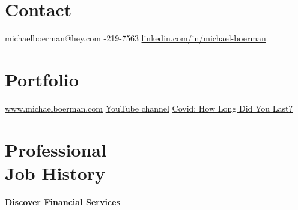 \documentclass[margin, line]{res}
\begin{document}
\address{Data scientist with M.S. and 3 years experience driving decisions by modeling financial and economic data.}
\begin{resume}

\vspace{-1mm}
\section{\sc Contact}

\faEnvelope  \hspace{0.5mm} {\ttfamily michaelboerman@hey.com} \hspace{3mm}
\faPhone  \hspace{0.5mm} {-219-7563} \hspace{8.5mm}
\faLinkedinIn  \hspace{0.5mm} \href{https://www.linkedin.com/in/michael-boerman}{\ttfamily linkedin.com/in/michael-boerman}\\
\vspace{-5mm}


\section{\sc Portfolio}
\faBriefcase \hspace{0.5mm} \href{https://www.michaelboerman.com/}{\ttfamily www.michaelboerman.com} \hspace{3.5mm}
 \hspace{0.5mm} \href{https://www.youtube.com/channel/UCxFMrMb6PrS7SOrQi-BfMUw/videos?view=0&sort=p&flow=grid}{YouTube channel} \hspace{2mm}
\faChartLine \hspace{0.5mm} \href{https://michaelboerman.shinyapps.io/covid_percentiles/}{ Covid: How Long Did You Last?}\\
\vspace{-.35cm}


\section{\sc Professional \\ Job History }

{\bf Discover Financial Services}\\


\end{resume}
\end{document}
